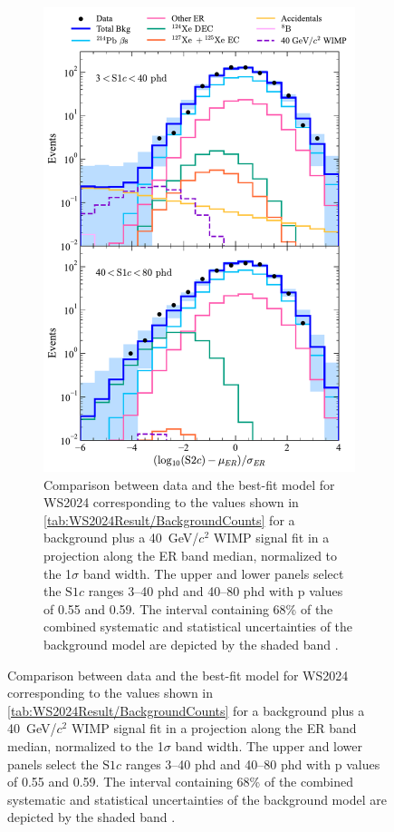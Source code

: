 \begin{figure}[!ht]
	\hfill
	\begin{subfigure}[b]{0.49\textwidth}
		\centering
		\includegraphics[width=\textwidth]{figures/WS2024Result/figure4.pdf}
		\caption{Comparison between data and the best-fit model for WS2024 corresponding to the values shown in \autoref{tab:WS2024Result/BackgroundCounts} for a background plus a 40~GeV/$c^2$ WIMP signal fit in a projection along the ER band median, normalized to the 1$\sigma$ band width. The upper and lower panels select the $\text{S1}c$ ranges 3–40 phd and 40–80 phd with p values of 0.55 and 0.59. The interval containing 68\% of the combined systematic and statistical uncertainties of the background model are depicted by the shaded band \cite{LZCollaboration:2024lux}.}
        \label{fig:WS2024Result/fig4}
	\end{subfigure}

\end{figure}
